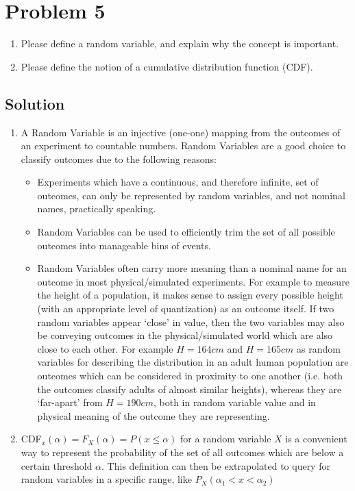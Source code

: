 \section{Problem 5}
\begin{enumerate}[5a.]
	\item Please define a random variable, and explain why the concept is important.
	\item Please define the notion of a cumulative distribution function (CDF).
\end{enumerate}

\subsection{Solution}


\begin{enumerate}[5a.]
	\item A Random Variable is an injective (one-one) mapping from the outcomes of an experiment to countable numbers. Random Variables are a good choice to classify outcomes due to the following reasons:
		\begin{itemize}
			\item Experiments which have a continuous, and therefore infinite, set of outcomes, can only be represented by random variables, and not nominal names, practically speaking.
			\item Random Variables can be used to efficiently trim the set of all possible outcomes into manageable bins of events.
			\item Random Variables often carry more meaning than a nominal name for an outcome in most physical/simulated experiments. For example to measure the height of a population, it makes sense to assign every possible height (with an appropriate level of quantization) as an outcome itself. If two random variables appear `close' in value, then the two variables may also be conveying outcomes in the physical/simulated world which are also close to each other. For example $H=164cm$ and $H=165cm$ as random variables for describing the distribution in an adult human population are outcomes which can be considered in proximity to one another (i.e. both the outcomes classify adults of almost similar heights), whereas they are `far-apart' from $H=190cm$, both in random variable value and in physical meaning of the outcome they are representing.
		\end{itemize} 
	\item CDF$_x(\alpha) = F_X(\alpha) = P(x \leq \alpha)$ for a random variable $X$ is a convenient way to represent the probability of the set of all outcomes which are below a certain threshold $\alpha$. This definition can then be extrapolated to query for random variables in a specific range, like $P_X(\alpha_1 < x < \alpha_2)$\\

\end{enumerate}

